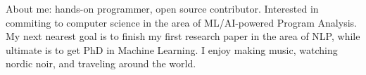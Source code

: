 \documentclass[10pt,a4paper,normalphoto]{altacv}
\begin{document}
  \makecvheader
  About me: hands-on programmer, open source contributor.
  Interested in commiting to computer science in the area of ML/AI-powered
  Program Analysis. My next nearest goal is to finish my first research paper
  in the area of NLP, while ultimate is to get PhD in Machine Learning. I enjoy
  making music, watching nordic noir, and traveling around the world.
\end{document}
